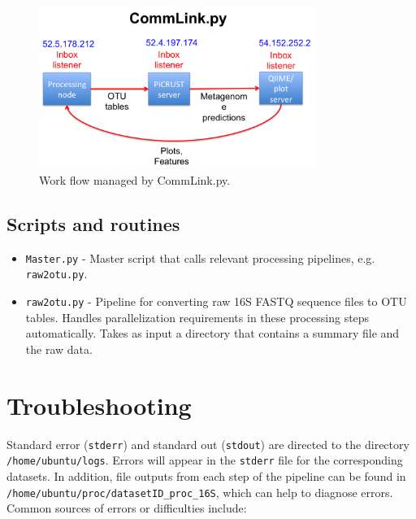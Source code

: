 \documentclass[11pt, oneside]{article}   	%
\begin{document}
\begin{figure}
\centering
	\includegraphics[width=0.8\textwidth]{figs/CommLink.png}
\caption{Work flow managed by CommLink.py.}
\end{figure}

\subsection{Scripts and routines}
\begin{itemize}
	\item {\tt Master.py} - Master script that calls relevant processing pipelines, e.g. {\tt raw2otu.py}.
	\item {\tt raw2otu.py} - Pipeline for converting raw 16S FASTQ sequence files to OTU tables.  Handles parallelization requirements in these processing steps automatically.  Takes as input a directory that contains a summary file and the raw data.
\end{itemize}

\section{Troubleshooting}
Standard error ({\tt stderr}) and standard out ({\tt stdout}) are directed to the directory {\tt /home/ubuntu/logs}.  Errors will appear in the {\tt stderr} file for the corresponding datasets.  In addition, file outputs from each step of the pipeline can be found in {\tt /home/ubuntu/proc/datasetID\_proc\_16S}, which can help to diagnose errors.  Common sources of errors or difficulties include:
\end{document}
